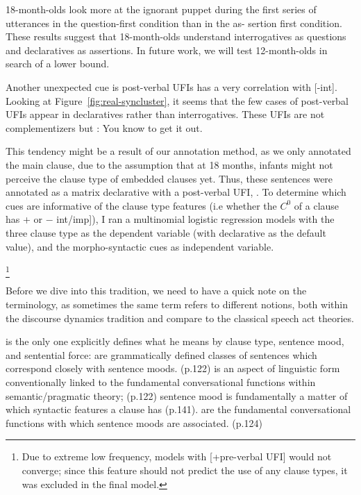 18-month-olds look more at the ignorant puppet during the first series of utterances in the question-first condition than in the as- sertion first condition. These results suggest that 18-month-olds understand interrogatives as questions and declaratives as assertions. In future work, we will test 12-month-olds in search of a lower bound.


Another unexpected cue is post-verbal UFIs has a very correlation with [-int]. Looking at Figure~\ref{fig:real-syncluster}, it seems that the few cases of post-verbal UFIs appear in declaratives rather than interrogatives. These UFIs are not complementizers but :
You know  to get it out.
\eex

This tendency might be a result of our annotation method, as we only annotated the main clause, due to the assumption that at 18 months, infants might not perceive the clause type of embedded clauses yet. Thus, these sentences were annotated as a matrix declarative with a post-verbal UFI, . 
To determine which cues are informative of the clause type features (i.e whether the $C^{0}$ of a clause has + or $-$ int/imp]), I ran a multinomial logistic regression models with the three clause type as the dependent variable (with declarative as the default value), and the morpho-syntactic cues as independent variable. 


\footnote{Due to extreme low frequency, models with [+pre-verbal UFI] would not converge; since this feature should not predict the use of any clause types, it was excluded in the final model.} 



Before we dive into this tradition, we need to have a quick note on the terminology, as sometimes the same term refers to different notions, both within the discourse dynamics tradition and compare to the classical speech act theories. 

\textcite{portner2018} is the only one explicitly defines what he means by clause type, sentence mood, and sentential force: 
\bxl
{} are grammatically defined classes of sentences which correspond closely with sentence moods. (p.122)
\ex{} is an aspect of linguistic form conventionally linked to the fundamental conversational functions within semantic/pragmatic theory; (p.122) sentence mood is fundamentally a matter of which syntactic features a clause has (p.141). 
\ex {} are the fundamental conversational functions with which sentence moods are associated. (p.124)
\exl
\eex


